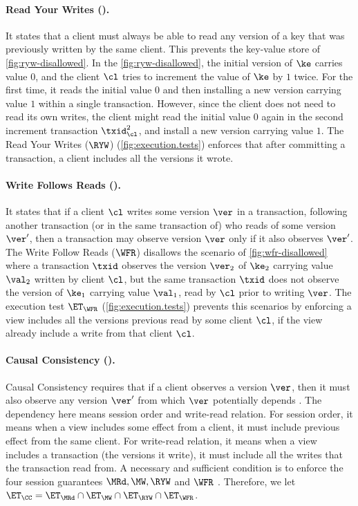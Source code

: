 \paragraph{Read Your Writes (\RYW).}
It states that a client must always be able to read any version of a key that was previously written by the same client.
This prevents the key-value store of \cref{fig:ryw-disallowed}. 
In the \cref{fig:ryw-disallowed}, the initial version of $\ke$ carries value $0$, 
and the client $\cl$ tries to increment the value of $\ke$ by $1$ twice.
For the first time, it reads the initial value $0$ and then installing a new version carrying  value $1$ within a single transaction.
However, since the client does not need to read its own writes, 
the client might read the initial value $0$ again in the second increment transaction \( \txid_\cl^2 \),
and install a new version carrying value $1$.
The Read Your Writes ($\RYW$) (\cref{fig:execution.tests}) enforces that after committing a transaction, 
a client includes all the versions it wrote.  

\paragraph{Write Follows Reads (\WFR).}
It states that if a client \( \cl \) writes some version $\ver$ in a transaction,
following  another transaction (or in the same transaction of) who reads of some version $\ver'$, 
then a transaction may observe version $\ver$ only if it also observes $\ver'$. 
The Write Follow Reads ($\WFR$) disallows the scenario of \cref{fig:wfr-disallowed} 
where a transaction $\txid$ observes the version $\ver_2$ of $\ke_2$ carrying value $\val_2$ written by client $\cl$,
but the same transaction $\txid$ does not observe the version of $\ke_1$ carrying value $\val_1$, read by $\cl$ prior to writing $\ver$. 
The execution test $\ET_{\WFR}$ (\cref{fig:execution.tests}) prevents this scenarios 
by enforcing a view includes all the versions previous read by some client \( \cl \), 
if the view already include a write from that client \( \cl \).

\paragraph{Causal Consistency (\CC).}
Causal Consistency requires that if a client observes a version $\ver$, 
then it must also observe any version $\ver'$ from which $\ver$ potentially depends \cite{cops}. 
The dependency here means session order and write-read relation.
For session order, it means when a view includes some effect from a client, 
it must include previous effect from the same client.
For write-read relation, it means when a view includes a transaction (the versions it write),
it must include all the writes that the transaction read from.
A necessary and sufficient condition is to enforce the four session guarantees $\MRd, \MW, \RYW$ and $\WFR$ \cite{session2causal}.
Therefore, we let $\ET_{\CC} = \ET_{\MRd} \cap \ET_{\MW} \cap \ET_{\RYW} \cap \ET_{\WFR}$. 

